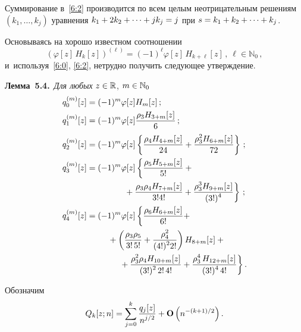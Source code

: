 \begin{multicols}{2}
  Суммирование в~\eqref{6:2} производится по всем целым неотрицательным решениям
  $(k_1,\ldots,k_j)$ уравнения
 $k_1\hm+2k_2+\cdots+j k_j\hm=j$ при $s\hm=k_1\hm+k_2+\cdots+k_j$.

 Основываясь на хорошо известном соотношении
 \begin{equation*}
 \left(\varphi[z]\,H_k[z]\right)^{(\ell)}=(-1)^\ell
 \varphi[z]\,H_{k+\ell}[z]\,,\ \ell\in \mathbb{N}_0\,,
 \end{equation*}
 и~используя~\eqref{6:0}, \eqref{6:2}, нетрудно получить следу\-ющее утверждение.

\smallskip

\noindent
\textbf{Лемма~5.4.}\
\textit{Для любых} $z\hm\in\mathbb{R}$, $m\hm\in\Np_0$
 \begin{align*}
  q_0^{(m)}[z]&=(-1)^m\varphi[z]H_m[z]\,;\\
  q_1^{(m)}[z]&=(-1)^m\varphi[z]\fr{\rho_3 H_{3+m}[z]}{6}\,;\\
 q_2^{(m)}[z]&=(-1)^m \varphi[z]\left\{
 \fr{\rho_4 H_{4+m}[z]}{24}+\fr{\rho_3^2 H_{6+m}[z]}{72}
 \right\}\,;\\
 q_3^{(m)}[z]&=(-1)^m\varphi[z] \left\{
 \fr{\rho_5 H_{5+m}[z]}{5!}+{}\right.\\
&\hspace*{15mm}\left. {}+\fr{\rho_3 \rho_4 H_{7+m}[z]}{3!4!}+
 \fr{\rho_3^3 H_{9+m}[z]}{(3!)^4}
 \right\}\,;\\
 q_4^{(m)}[z]&=(-1)^m\varphi[z]   \left\{
 \fr{\rho_6 H_{6+m}[z]}{6!}+\right.\\
&\left. \hspace*{8mm}{}+
 \left( \fr{\rho_3 \rho_5}{3!\,5!}+\fr{\rho_4^2}{(4!)^2 2!}\right) H_{8+m}[z]+ {} \right.\\
&\left.
\hspace*{13mm}{}  +\fr{\rho_3^2 \rho_4 H_{10+m}[z]}{(3!)^2\,2!\, 4!}+
 \fr{\rho_3^4\,H_{12+m}[z]}{(3!)^4\,4!}
 \right\}.
 \end{align*}


 Обозначим
  \begin{equation}
  Q_k[z;n]=\sum\limits_{j=0}^k \displaystyle\frac{\displaystyle q_j[z]\mathstrut}{\displaystyle n^{j/2}\mathstrut} +\mathbf{O}\left(n^{-(k+1)/2}\right).
  \label{6:9}
  \end{equation}


\end{multicols}
